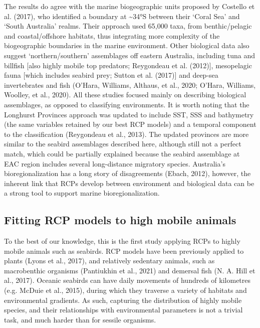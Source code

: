 \documentclass{article}
\begin{document}
The results do agree with the marine biogeographic units proposed by Costello et al. (2017), who identified a boundary at \textasciitilde34°S between their `Coral Sea' and `South Australia' realms. Their approach used 65,000 taxa, from benthic/pelagic and coastal/offshore habitats, thus integrating more complexity of the biogeographic boundaries in the marine environment. Other biological data also suggest `northern/southern' assemblages off eastern Australia, including tuna and billfish {[}also highly mobile top predators; Reygondeau et al. (2012){]}, mesopelagic fauna {[}which includes seabird prey; Sutton et al. (2017){]} and deep-sea invertebrates and fish (O'Hara, Williams, Althaus, et al., 2020; O'Hara, Williams, Woolley, et al., 2020). All these studies focused mainly on describing biological assemblages, as opposed to classifying environments. It is worth noting that the Longhurst Provinces approach was updated to include SST, SSS and bathymetry (the same variables retained by our best RCP models) and a temporal component to the classification (Reygondeau et al., 2013). The updated provinces are more similar to the seabird assemblages described here, although still not a perfect match, which could be partially explained because the seabird assemblage at EAC region includes several long-distance migratory species. Australia's bioregionalization has a long story of disagreements (Ebach, 2012), however, the inherent link that RCPs develop between environment and biological data can be a strong tool to support marine bioregionalization.

\hypertarget{fitting-rcp-models-to-high-mobile-animals}{%
\subsection{Fitting RCP models to high mobile animals}\label{fitting-rcp-models-to-high-mobile-animals}}

To the best of our knowledge, this is the first study applying RCPs to highly mobile animals such as seabirds. RCP models have been previously applied to plants (Lyons et al., 2017), and relatively sedentary animals, such as macrobenthic organisms (Pantiukhin et al., 2021) and demersal fish (N. A. Hill et al., 2017). Oceanic seabirds can have daily movements of hundreds of kilometres (e.g. McDuie et al., 2015), during which they traverse a variety of habitats and environmental gradients. As such, capturing the distribution of highly mobile species, and their relationships with environmental parameters is not a trivial task, and much harder than for sessile organisms.
\end{document}
